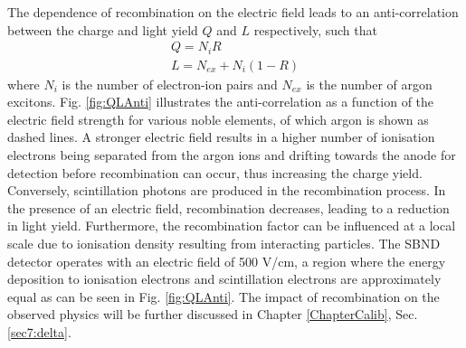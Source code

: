 
The dependence of recombination on the electric field leads to an anti-correlation between the charge and light yield $Q$ and $L$ respectively, such that \cite{argoneut_recomb}
\begin{gather}
        \label{eq:Q}
        Q = N_{i}R \\ 
        \label{eq:L}
        L = N_{ex} + N_{i}(1 - R)
\end{gather}
where $N_{i}$ is the number of electron-ion pairs and $N_{ex}$ is the number of argon excitons.
Fig. \ref{fig:QLAnti} illustrates the anti-correlation as a function of the electric field strength for various noble elements, of which argon is shown as dashed lines.
A stronger electric field results in a higher number of ionisation electrons being separated from the argon ions and drifting towards the anode for detection before recombination can occur, thus increasing the charge yield. 
Conversely, scintillation photons are produced in the recombination process.
In the presence of an electric field, recombination decreases, leading to a reduction in light yield.
Furthermore, the recombination factor can be influenced at a local scale due to ionisation density resulting from interacting particles.
The SBND detector operates with an electric field of 500 V/cm, a region where the energy deposition to ionisation electrons and scintillation electrons are approximately equal as can be seen in Fig.
 \ref{fig:QLAnti}.
The impact of recombination on the observed physics will be further discussed in Chapter \ref{ChapterCalib}, Sec. \ref{sec7:delta}.

